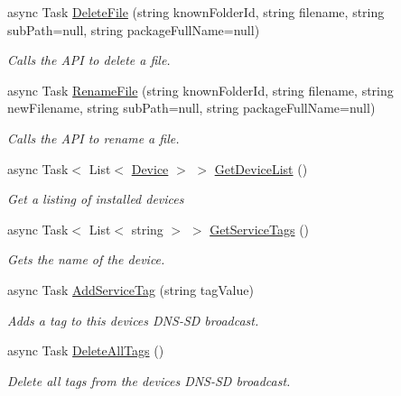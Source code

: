\begin{DoxyCompactItemize}
async Task \hyperlink{class_microsoft_1_1_tools_1_1_windows_device_portal_1_1_device_portal_a22354f1c577dcd6522f3e3cb37ca0c26}{Delete\+File} (string known\+Folder\+Id, string filename, string sub\+Path=null, string package\+Full\+Name=null)
\begin{DoxyCompactList}\small\item\em Calls the A\+PI to delete a file. \end{DoxyCompactList}\item 
async Task \hyperlink{class_microsoft_1_1_tools_1_1_windows_device_portal_1_1_device_portal_a13cd33ad2290d431669ef909703ec74d}{Rename\+File} (string known\+Folder\+Id, string filename, string new\+Filename, string sub\+Path=null, string package\+Full\+Name=null)
\begin{DoxyCompactList}\small\item\em Calls the A\+PI to rename a file. \end{DoxyCompactList}\item 
async Task$<$ List$<$ \hyperlink{class_microsoft_1_1_tools_1_1_windows_device_portal_1_1_device_portal_1_1_device}{Device} $>$ $>$ \hyperlink{class_microsoft_1_1_tools_1_1_windows_device_portal_1_1_device_portal_a3f534ebd174d90721df8aca0e90e0284}{Get\+Device\+List} ()
\begin{DoxyCompactList}\small\item\em Get a listing of installed devices \end{DoxyCompactList}\item 
async Task$<$ List$<$ string $>$ $>$ \hyperlink{class_microsoft_1_1_tools_1_1_windows_device_portal_1_1_device_portal_ac275ad56f705a65dae21ffb2389227c6}{Get\+Service\+Tags} ()
\begin{DoxyCompactList}\small\item\em Gets the name of the device. \end{DoxyCompactList}\item 
async Task \hyperlink{class_microsoft_1_1_tools_1_1_windows_device_portal_1_1_device_portal_aa92c23864e3d3029a71b7a61e2ed43a2}{Add\+Service\+Tag} (string tag\+Value)
\begin{DoxyCompactList}\small\item\em Adds a tag to this device\textquotesingle{}s D\+N\+S-\/\+SD broadcast. \end{DoxyCompactList}\item 
async Task \hyperlink{class_microsoft_1_1_tools_1_1_windows_device_portal_1_1_device_portal_a8ce11b2e20f39901b0debe4b26979a4c}{Delete\+All\+Tags} ()
\begin{DoxyCompactList}\small\item\em Delete all tags from the device\textquotesingle{}s D\+N\+S-\/\+SD broadcast. \end{DoxyCompactList}\item 

\end{DoxyCompactItemize}
